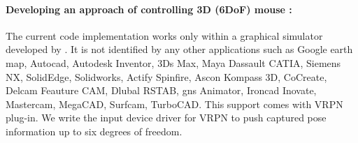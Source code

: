\paragraph{Developing an approach of controlling 3D (6DoF) mouse :}

The current code implementation works only within a graphical simulator developed by \cite{thomas}. It is not identified by any other applications such as Google earth map, Autocad, Autodesk Inventor, 3Ds Max, Maya Dassault CATIA, Siemens NX, SolidEdge, Solidworks, Actify Spinfire, Ascon Kompass 3D, CoCreate, Delcam Feauture CAM, Dlubal RSTAB, gns Animator, Ironcad Inovate, Mastercam, MegaCAD, Surfcam, TurboCAD. This support comes with VRPN plug-in. We write the input device driver for VRPN to push captured pose information up to six degrees of freedom.  






